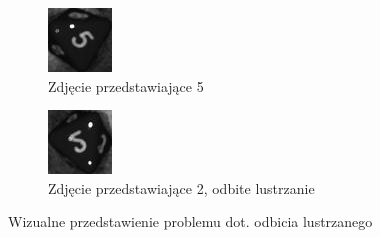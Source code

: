 \begin{figure}[h]
    \centering
    \begin{subfigure}[t]{0.45\linewidth}
        \centering
        \includegraphics[width=\linewidth]{chapters/04-czytanie/figures/5_preprocessed}
        \caption{Zdjęcie przedstawiające 5}
        \label{fig:5_confusion}
    \end{subfigure}
    \hfill
    \begin{subfigure}[t]{0.45\linewidth}
        \centering
        \includegraphics[width=\linewidth]{chapters/04-czytanie/figures/2_mirror}
        \caption{Zdjęcie przedstawiające 2, odbite lustrzanie}
        \label{fig:2_confusion}
    \end{subfigure}
    \caption{Wizualne przedstawienie problemu dot. odbicia lustrzanego}
    \label{fig:25confusion}
\end{figure}

